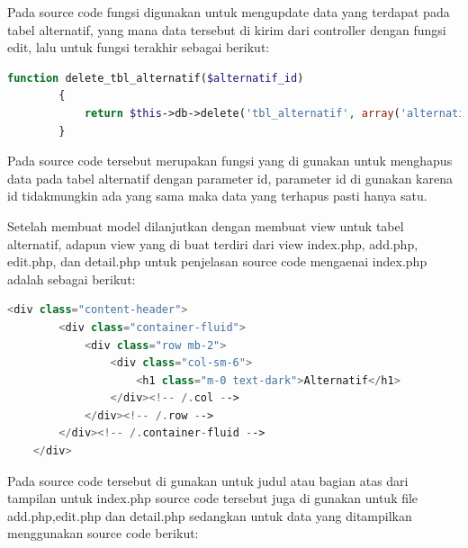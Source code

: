 Pada source code fungsi digunakan untuk mengupdate data yang terdapat pada tabel alternatif, yang mana data tersebut di kirim dari controller dengan fungsi edit, lalu untuk fungsi terakhir sebagai berikut:\par

\begin{lstlisting}[language=PHP]
	    function delete_tbl_alternatif($alternatif_id)  
	    {  
	        return $this->db->delete('tbl_alternatif', array('alternatif_id' => $alternatif_id));  
	    } 
\end{lstlisting}

Pada source code tersebut merupakan fungsi yang di gunakan untuk menghapus data pada tabel alternatif dengan parameter id, parameter id di gunakan karena id tidakmungkin ada yang sama maka data yang terhapus pasti hanya satu.\par
Setelah membuat model dilanjutkan dengan membuat view untuk tabel alternatif, adapun view yang di buat terdiri dari view index.php, add.php, edit.php, dan detail.php untuk penjelasan source code mengaenai index.php adalah sebagai berikut:

\begin{lstlisting}[language=PHP]
	<div class="content-header">  
	    <div class="container-fluid">  
	        <div class="row mb-2">  
	            <div class="col-sm-6">  
	                <h1 class="m-0 text-dark">Alternatif</h1>  
	            </div><!-- /.col -->  
	        </div><!-- /.row -->  
	    </div><!-- /.container-fluid -->  
	</div>  
\end{lstlisting}

Pada source code tersebut di gunakan untuk judul atau bagian atas dari tampilan untuk index.php source code tersebut juga di gunakan untuk file add.php,edit.php dan detail.php sedangkan untuk data yang ditampilkan menggunakan source code berikut:\par

